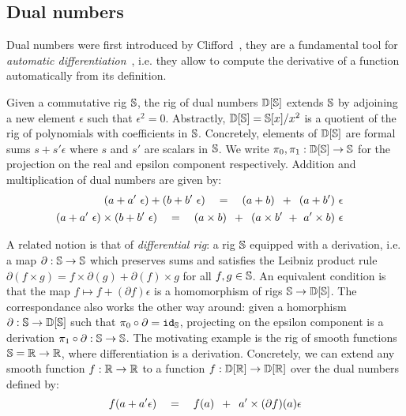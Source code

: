 
\subsection{Dual numbers}\label{1-dual-numbers}

Dual numbers were first introduced by Clifford~\cite{Clifford73}, they are a fundamental tool for \emph{automatic differentiation}~\cite{Hoffmann16}, i.e. they allow to compute the derivative of a function automatically from its definition.

Given a commutative rig $\S$, the rig of dual numbers $\D[\S]$ extends $\S$ by adjoining a new element $\epsilon$ such that $\epsilon^2 = 0$.
Abstractly, $\D[\S] = \S[x] / x^2$ is a quotient of the rig of polynomials with coefficients in $\S$.
Concretely, elements of $\D[\S]$ are formal sums $s + s' \epsilon$ where $s$ and $s'$ are scalars in $\S$.
We write $\pi_0, \pi_1 : \D[\S] \to \S$
for the projection on the real and epsilon component respectively.
Addition and multiplication of dual numbers are given by:
\begin{align} \begin{split}\label{linearity}
(a + a' \ \epsilon ) + (b + b' \ \epsilon)
\quad &= \quad (a + b) \s + \s (a + b') \ \epsilon
\end{split}\\
\begin{split}\label{product-rule}
(a + a' \ \epsilon ) \times (b + b' \ \epsilon)
\quad &= \quad (a \times b) \s + \s (a \times b' \ + \ a' \times b) \ \epsilon
\end{split}
\end{align}

A related notion is that of \emph{differential rig}: a rig $\S$ equipped with a derivation, i.e. a map $\partial : \S \to \S$ which preserves sums and satisfies the Leibniz product rule
$\partial(f \times g) = f \times \partial(g) + \partial(f) \times g$ for all $f, g \in \S$.
An equivalent condition is that the map $f \mapsto f + (\partial f) \epsilon$ is a homomorphism of rigs $\S \to \D[\S]$.
The correspondance also works the other way around: given a homorphism $\partial : \S \to \D[\S]$ such that $\pi_0 \circ \partial = \id_\S$, projecting on the epsilon component is a derivation $\pi_1 \circ \partial : \S \to \S$.
The motivating example is the rig of smooth functions $\S = \R \to \R$, where differentiation is a derivation.
Concretely, we can extend any smooth function $f : \R \to \R$ to a function $f : \D[\R] \to \D[\R]$ over the dual numbers defined by:
\begin{equation}\label{dual-numbers-eq}
f(a + a' \epsilon) \quad = \quad f(a) \s + \s a' \times (\partial f)(a) \epsilon
\end{equation}

